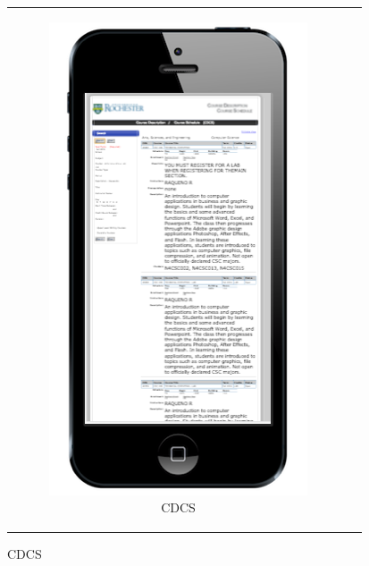 \begin{figure}[ht]
  \centering
  \vspace{10pt}
  \begin{tabular}{c c}
    \begin{subfigure}[h]{4.8cm}
      \centering
      \includegraphics[width=1.00\textwidth]{images/cdcs/mobile}
      \caption{CDCS} \label{fig:cdcs-mobile}
    \end{subfigure}

\end{tabular}
\end{figure}
